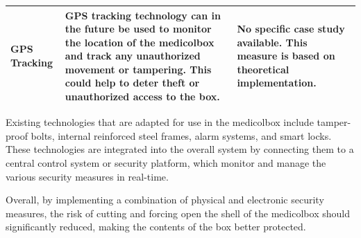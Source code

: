 \documentclass[../main.tex]{subfiles}
\begin{document}
\begin{table}[htbp]
\begin{tabular}{|l|p{8.5cm}|p{5.5cm}|}
        GPS Tracking &
        GPS tracking technology can in the future be used to monitor the location of the \gls{medicolbox} and track any unauthorized movement or tampering. This could help to deter theft or unauthorized access to the box. & No specific case study available. This measure is based on theoretical implementation. \\ \hline
    \end{tabular}
\end{table}


Existing technologies that are adapted for use in the \gls{medicolbox}
include tamper-proof bolts, internal reinforced steel frames,
alarm systems, and smart locks.
These technologies are integrated into the overall system
by connecting them to a central control system or security platform,
which monitor and manage the various security measures in real-time.

Overall, by implementing a combination of
physical and electronic security measures,
the risk of cutting and forcing open the shell of the \gls{medicolbox}
should significantly reduced,
making the contents of the box better protected.
\end{document}
